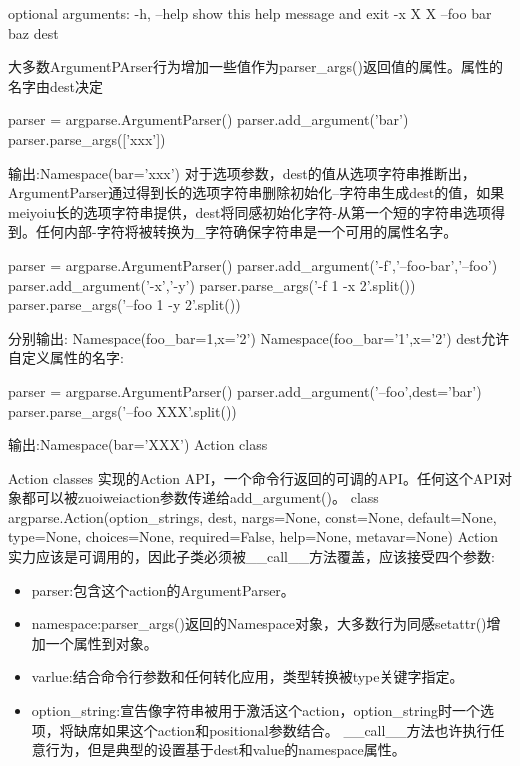 optional arguments:\newline
 -h, --help     show this help message and exit\newline
 -x X X\newline
 --foo bar baz\newline
dest\par
大多数ArgumentPArser行为增加一些值作为parser\_args()返回值的属性。属性的名字由dest决定
\begin{python}
parser = argparse.ArgumentParser()
parser.add_argument('bar')
parser.parse_args(['xxx'])
\end{python}
输出:Namespace(bar='xxx')\newline
对于选项参数，dest的值从选项字符串推断出，ArgumentParser通过得到长的选项字符串删除初始化--字符串生成dest的值，如果meiyoiu长的选项字符串提供，dest将同感初始化字符-从第一个短的字符串选项得到。任何内部-字符将被转换为\_字符确保字符串是一个可用的属性名字。
\begin{python}
parser = argparse.ArgumentParser()
parser.add_argument('-f','--foo-bar','--foo')
parser.add_argument('-x','-y')
parser.parse_args('-f 1 -x 2'.split())
parser.parse_args('--foo 1 -y 2'.split())
\end{python}
分别输出:\newline
Namespace(foo\_bar=1,x='2')\newline
Namespace(foo\_bar='1',x='2')\newline
dest允许自定义属性的名字:
\begin{python}
parser = argparse.ArgumentParser()
parser.add_argument('--foo',dest='bar')
parser.parse_args('--foo XXX'.split())
\end{python}
输出:Namespace(bar='XXX')\newline
Action class\par
Action classes 实现的Action API，一个命令行返回的可调的API。任何这个API对象都可以被zuoiweiaction参数传递给add\_argument()。
class argparse.Action(option\_strings, dest, nargs=None, const=None, default=None, type=None, choices=None, required=False, help=None, metavar=None)
Action实力应该是可调用的，因此子类必须被\_\_call\_\_方法覆盖，应该接受四个参数:
\begin{itemize}
\item parser:包含这个action的ArgumentParser。
\item namespace:parser\_args()返回的Namespace对象，大多数行为同感setattr()增加一个属性到对象。
\item varlue:结合命令行参数和任何转化应用，类型转换被type关键字指定。
\item option\_string:宣告像字符串被用于激活这个action，option\_string时一个选项，将缺席如果这个action和positional参数结合。
\_\_call\_\_方法也许执行任意行为，但是典型的设置基于dest和value的namespace属性。
\end{itemize}
